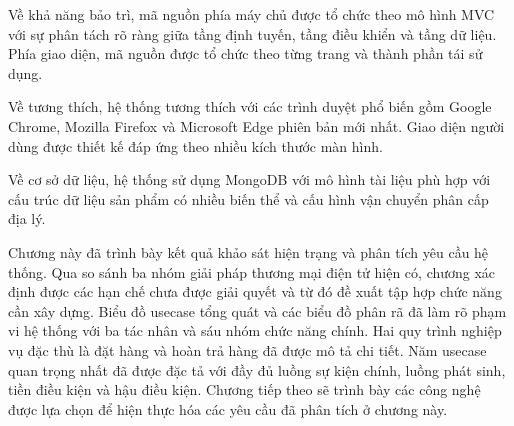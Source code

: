 \documentclass[../DoAn.tex]{subfiles}
\begin{document}
  Về khả năng bảo trì, mã nguồn phía máy chủ được tổ chức theo mô hình MVC với
  sự phân tách rõ ràng giữa tầng định tuyến, tầng điều khiển và tầng dữ liệu.
  Phía giao diện, mã nguồn được tổ chức theo từng trang và thành phần tái sử dụng.

  Về tương thích, hệ thống tương thích với các trình duyệt phổ biến gồm Google
  Chrome, Mozilla Firefox và Microsoft Edge phiên bản mới nhất. Giao diện người
  dùng được thiết kế đáp ứng theo nhiều kích thước màn hình.

  Về cơ sở dữ liệu, hệ thống sử dụng MongoDB với mô hình tài liệu phù hợp với
  cấu trúc dữ liệu sản phẩm có nhiều biến thể và cấu hình vận chuyển phân cấp
  địa lý.

  Chương này đã trình bày kết quả khảo sát hiện trạng và phân tích yêu cầu hệ
  thống. Qua so sánh ba nhóm giải pháp thương mại điện tử hiện có, chương xác
  định được các hạn chế chưa được giải quyết và từ đó đề xuất tập hợp chức năng
  cần xây dựng. Biểu đồ usecase tổng quát và các biểu đồ phân rã đã làm rõ
  phạm vi hệ thống với ba tác nhân và sáu nhóm chức năng chính. Hai quy trình
  nghiệp vụ đặc thù là đặt hàng và hoàn trả hàng đã được mô tả chi tiết. Năm usecase quan trọng nhất đã được đặc tả với đầy đủ luồng sự kiện chính, luồng
  phát sinh, tiền điều kiện và hậu điều kiện. Chương tiếp theo sẽ trình bày các
  công nghệ được lựa chọn để hiện thực hóa các yêu cầu đã phân tích ở chương này.

  
\end{document}
